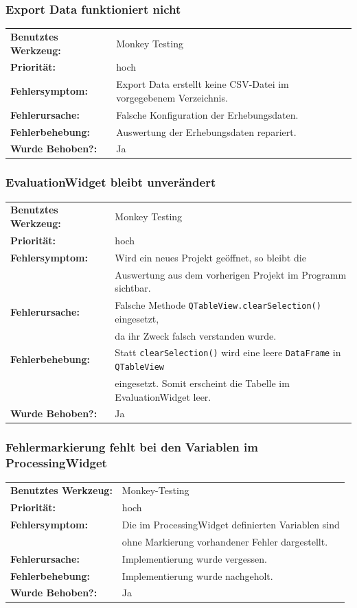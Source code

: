\documentclass{article}
\begin{document}
\subsubsection*{Export Data funktioniert nicht}
\begin{tabular}{ll}
    \textbf{Benutztes Werkzeug:} & Monkey Testing\\
    \textbf{Priorität:} & hoch\\
    \textbf{Fehlersymptom:} & Export Data erstellt keine CSV-Datei im vorgegebenem Verzeichnis.\\
    \textbf{Fehlerursache:} & Falsche Konfiguration der Erhebungsdaten.\\
    \textbf{Fehlerbehebung:} & Auswertung der Erhebungsdaten repariert.\\
    \textbf{Wurde Behoben?:} & Ja\\
\end{tabular}

\subsubsection*{EvaluationWidget bleibt unverändert}
\begin{tabular}{ll}
    \textbf{Benutztes Werkzeug:} & Monkey Testing\\
    \textbf{Priorität:} & hoch\\
    \textbf{Fehlersymptom:} & Wird ein neues Projekt geöffnet, so bleibt die \\
    & Auswertung aus dem vorherigen Projekt im Programm sichtbar.\\
    \textbf{Fehlerursache:} & Falsche Methode \texttt{QTableView.clearSelection()} eingesetzt, \\
    & da ihr Zweck falsch verstanden wurde. \\
    \textbf{Fehlerbehebung:} & Statt \texttt{clearSelection()}  wird eine leere \texttt{DataFrame} in \texttt{QTableView}\\
    & eingesetzt. Somit erscheint die Tabelle im EvaluationWidget leer.\\
    \textbf{Wurde Behoben?:} & Ja\\
\end{tabular}

\subsubsection*{Fehlermarkierung fehlt bei den Variablen im ProcessingWidget}
\begin{tabular}{ll}
    \textbf{Benutztes Werkzeug:} & Monkey-Testing\\
    \textbf{Priorität:} & hoch\\
    \textbf{Fehlersymptom:} & Die im ProcessingWidget definierten Variablen sind\\
    & ohne Markierung vorhandener Fehler dargestellt.\\
    \textbf{Fehlerursache:} & Implementierung wurde vergessen.\\
    \textbf{Fehlerbehebung:} & Implementierung wurde nachgeholt.\\
    \textbf{Wurde Behoben?:} & Ja\\
\end{tabular}
\end{document}

